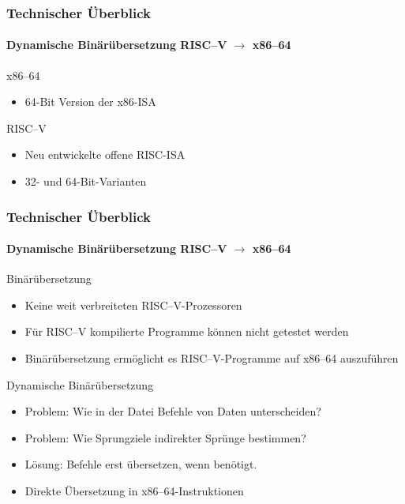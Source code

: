 \documentclass[aspectratio=169, sectionpage=false, german]{tumbeamer}
\newcommand{\refer}[0]{\ensuremath{\rightarrow} }
\begin{document}
\begin{frame}
	\frametitle{Technischer Überblick}

	\framesubtitle {Dynamische Binärübersetzung RISC--V \refer x86--64}

	\begin{block}{x86--64}
		\begin{itemize}
			\item 64-Bit Version der x86-ISA
		\end{itemize}
	\end{block}

	\vspace{1cm}

	\begin{block}{RISC--V}
		\begin{itemize}
			\item Neu entwickelte offene RISC-ISA
			\item 32- und 64-Bit-Varianten
		\end{itemize}
	\end{block}
\end{frame}
\begin{frame}
	\frametitle{Technischer Überblick}

	\framesubtitle {Dynamische Binärübersetzung RISC--V \refer x86--64}

	\begin{block}{Binärübersetzung}
		\begin{itemize}
			\item Keine weit verbreiteten RISC--V-Prozessoren
			\item Für RISC--V kompilierte Programme können nicht getestet werden
			\item Binärübersetzung ermöglicht es RISC--V-Programme auf x86--64 auszuführen
		\end{itemize}
	\end{block}
	\pause
	\begin{block}{Dynamische Binärübersetzung}
		\begin{itemize}
			\item Problem: Wie in der Datei Befehle von Daten unterscheiden?
			\item Problem: Wie Sprungziele indirekter Sprünge bestimmen?
			\item Lösung: Befehle erst übersetzen, wenn benötigt.
			\item Direkte Übersetzung in x86--64-Instruktionen
		\end{itemize}
	\end{block}
\end{frame}
\end{document}
